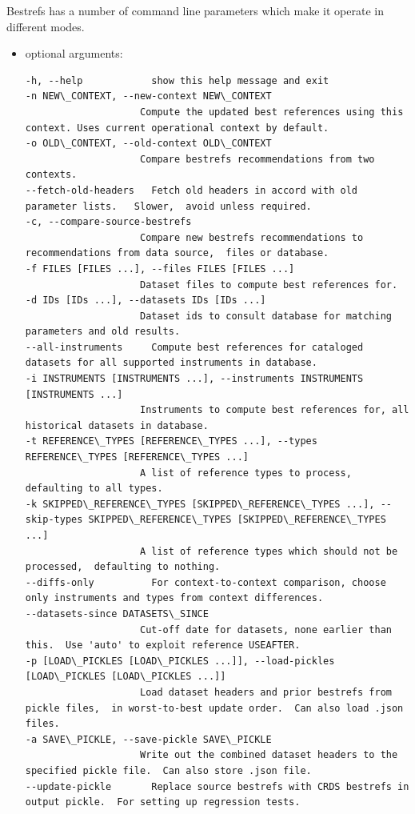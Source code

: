\documentclass[letterpaper,10pt,english]{sphinxmanual}
\begin{document}
Bestrefs has a number of command line parameters which make it operate in different modes.
\begin{itemize}
\item {} 
optional arguments:

\begin{Verbatim}[commandchars=\\\{\}]
-h, --help            show this help message and exit
-n NEW\_CONTEXT, --new-context NEW\_CONTEXT
                    Compute the updated best references using this context. Uses current operational context by default.
-o OLD\_CONTEXT, --old-context OLD\_CONTEXT
                    Compare bestrefs recommendations from two contexts.
--fetch-old-headers   Fetch old headers in accord with old parameter lists.   Slower,  avoid unless required.
-c, --compare-source-bestrefs
                    Compare new bestrefs recommendations to recommendations from data source,  files or database.
-f FILES [FILES ...], --files FILES [FILES ...]
                    Dataset files to compute best references for.
-d IDs [IDs ...], --datasets IDs [IDs ...]
                    Dataset ids to consult database for matching parameters and old results.
--all-instruments     Compute best references for cataloged datasets for all supported instruments in database.
-i INSTRUMENTS [INSTRUMENTS ...], --instruments INSTRUMENTS [INSTRUMENTS ...]
                    Instruments to compute best references for, all historical datasets in database.
-t REFERENCE\_TYPES [REFERENCE\_TYPES ...], --types REFERENCE\_TYPES [REFERENCE\_TYPES ...]
                    A list of reference types to process,  defaulting to all types.
-k SKIPPED\_REFERENCE\_TYPES [SKIPPED\_REFERENCE\_TYPES ...], --skip-types SKIPPED\_REFERENCE\_TYPES [SKIPPED\_REFERENCE\_TYPES ...]
                    A list of reference types which should not be processed,  defaulting to nothing.
--diffs-only          For context-to-context comparison, choose only instruments and types from context differences.
--datasets-since DATASETS\_SINCE
                    Cut-off date for datasets, none earlier than this.  Use 'auto' to exploit reference USEAFTER.
-p [LOAD\_PICKLES [LOAD\_PICKLES ...]], --load-pickles [LOAD\_PICKLES [LOAD\_PICKLES ...]]
                    Load dataset headers and prior bestrefs from pickle files,  in worst-to-best update order.  Can also load .json files.
-a SAVE\_PICKLE, --save-pickle SAVE\_PICKLE
                    Write out the combined dataset headers to the specified pickle file.  Can also store .json file.
--update-pickle       Replace source bestrefs with CRDS bestrefs in output pickle.  For setting up regression tests.

\end{Verbatim}
\end{itemize}
\end{document}

